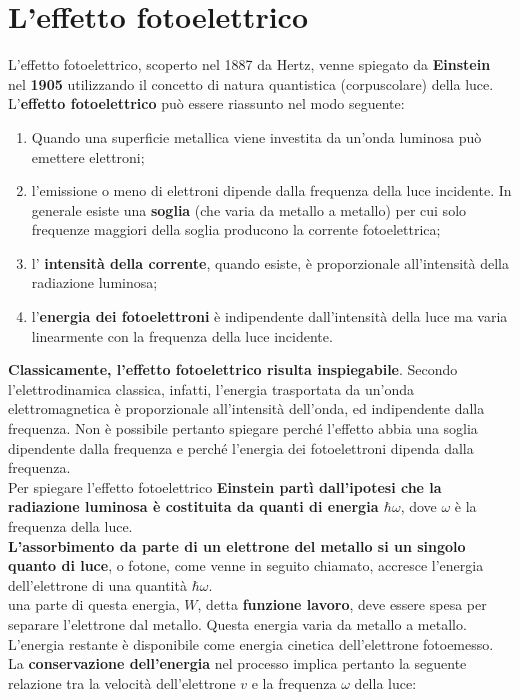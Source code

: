 \section{L'effetto fotoelettrico}
L'effetto fotoelettrico, scoperto nel 1887 da Hertz, venne spiegato da \textbf{Einstein} nel \textbf{1905} utilizzando il concetto di natura quantistica (corpuscolare) della luce.\\
L'\textbf{effetto fotoelettrico} può essere riassunto nel modo seguente:
\begin{enumerate}
\item Quando una superficie metallica viene investita da un'onda luminosa può emettere elettroni;
\item  l'emissione o meno di elettroni dipende dalla frequenza della luce incidente. In generale esiste una \textbf{soglia} (che varia da metallo a metallo) per cui solo frequenze maggiori della soglia producono la corrente fotoelettrica;
\item l' \textbf{intensità della corrente}, quando esiste, è proporzionale all'intensità della radiazione luminosa;
\item l'\textbf{energia dei fotoelettroni} è indipendente dall'intensità della luce ma varia linearmente con la frequenza della luce incidente.
\end{enumerate} 
\textbf{Classicamente, l'effetto fotoelettrico risulta inspiegabile}. Secondo l'elettrodinamica classica, infatti, l'energia trasportata da un'onda elettromagnetica è proporzionale all'intensità dell'onda, ed indipendente dalla frequenza. Non è possibile pertanto spiegare perché l'effetto abbia una soglia dipendente dalla frequenza e perché l'energia dei fotoelettroni dipenda dalla frequenza.\\
Per spiegare l'effetto fotoelettrico \textbf{Einstein partì dall'ipotesi che la radiazione luminosa è costituita da quanti di energia $\hbar \omega$}, dove $\omega$ è la frequenza della luce.\\
\textbf{L'assorbimento da parte di un elettrone del metallo si un singolo quanto di luce}, o fotone, come venne in seguito chiamato, accresce l'energia dell'elettrone di una quantità $\hbar \omega$.\\
una parte di questa energia, $W$, detta \textbf{funzione lavoro}, deve essere spesa per separare l'elettrone dal metallo. Questa energia varia da metallo a metallo. L'energia restante è disponibile come energia cinetica dell'elettrone fotoemesso. La \textbf{conservazione dell'energia} nel processo implica pertanto la seguente relazione tra la velocità dell'elettrone $v$ e la frequenza $\omega$ della luce:
